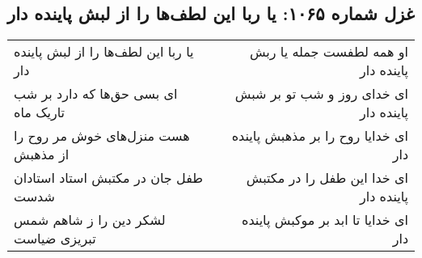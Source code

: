 \begin{center}
\section*{غزل شماره ۱۰۶۵: یا ربا این لطف‌ها را از لبش پاینده دار}
\label{sec:1065}
\begin{longtable}{l p{0.5cm} r}
یا ربا این لطف‌ها را از لبش پاینده دار
&&
او همه لطفست جمله یا ربش پاینده دار
\\
ای بسی حق‌ها که دارد بر شب تاریک ماه
&&
ای خدای روز و شب تو بر شبش پاینده دار
\\
هست منزل‌های خوش مر روح را از مذهبش
&&
ای خدایا روح را بر مذهبش پاینده دار
\\
طفل جان در مکتبش استاد استادان شدست
&&
ای خدا این طفل را در مکتبش پاینده دار
\\
لشکر دین را ز شاهم شمس تبریزی ضیاست
&&
ای خدایا تا ابد بر موکبش پاینده دار
\\
\end{longtable}
\end{center}

